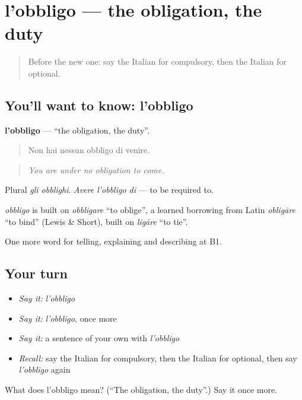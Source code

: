 \section[l'obbligo]{l'obbligo — the obligation, the duty}

\label{lesson:IT-C384-obbligo}



\begin{quote}
Before the new one: say the Italian for compulsory, then the Italian for optional.
\end{quote}

\subsection*{You'll want to know: l'obbligo}
\textbf{l'obbligo} — \textquotedblleft{}the obligation, the duty\textquotedblright{}.

\begin{quote}
Non hai nessun obbligo di venire.
\end{quote}

\begin{quote}
\emph{You are under no obligation to come.}
\end{quote}

Plural \emph{gli obblighi}. \emph{Avere l'obbligo di} — to be required to.

\begin{cousinweb}
\emph{obbligo} is built on \emph{obbligare} \textquotedblleft{}to oblige\textquotedblright{}, a learned borrowing from Latin \emph{obligāre} \textquotedblleft{}to bind\textquotedblright{} (Lewis \& Short), built on \emph{ligāre} \textquotedblleft{}to tie\textquotedblright{}.
\end{cousinweb}

\begin{grammarlens}[title={What you've built}]
One more word for telling, explaining and describing at B1.
\end{grammarlens}

\subsection*{Your turn}
\begin{itemize}
\raggedright
  \item \emph{Say it:} \emph{l'obbligo}
  \item \emph{Say it:} \emph{l'obbligo}, once more
  \item \emph{Say it:} a sentence of your own with \emph{l'obbligo}
  \item \emph{Recall:} say the Italian for compulsory, then the Italian for optional, then say \emph{l'obbligo} again
\end{itemize}

\begin{tcolorbox}[breakable,colback=teal!4,colframe=teal!35!black,title={Before you move on}]
What does l'obbligo mean? (\textquotedblleft{}The obligation, the duty\textquotedblright{}.) Say it once more.
\end{tcolorbox}

